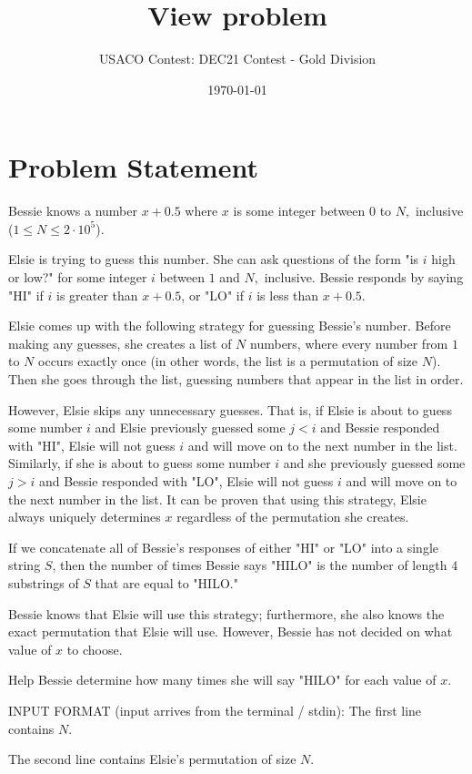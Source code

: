 \documentclass[12pt]{article}
\title{View problem}
\author{USACO Contest: DEC21 Contest - Gold Division}
\date{\today}
\begin{document}
\maketitle

\section*{Problem Statement}

Bessie knows a number $x+0.5$ where $x$ is some integer between $0$ to $N,$
inclusive ($1\le N\le 2 \cdot 10^5$).  

Elsie is trying to guess this number. She can ask questions of the form  "is $i$
high or low?" for some integer $i$ between $1$ and $N,$ inclusive.  Bessie
responds by saying "HI" if $i$ is greater than $x+0.5$, or "LO" if $i$ is less
than $x+0.5$.

Elsie comes up with the following strategy for guessing Bessie's number.  Before
making any guesses, she creates a list of $N$ numbers, where every number from
$1$ to $N$ occurs exactly once (in other words, the list is a permutation of
size $N$). Then she goes through the list, guessing numbers that appear in the
list in order.

However, Elsie skips any unnecessary guesses. That is, if Elsie is about to
guess some number $i$ and Elsie previously guessed some $j < i$ and Bessie
responded with "HI", Elsie will not guess $i$ and will move on to the next
number in the list. Similarly, if she is about to guess some number $i$ and she
previously guessed some $j > i$ and Bessie responded with "LO", Elsie will not
guess $i$ and will move on to the next number in the list. It can be proven that
using this strategy, Elsie always uniquely determines $x$ regardless of the
permutation she creates.

If we concatenate all of Bessie's responses of either "HI" or "LO" into a single
string $S$, then the number of times Bessie says "HILO" is the number of length
$4$ substrings of $S$ that are equal to "HILO."

Bessie knows that Elsie will use this strategy; furthermore, she also knows the
exact permutation that Elsie will use. However, Bessie has not decided on what
value of $x$ to choose.

Help Bessie determine how many times she will say "HILO" for each value of $x$.

INPUT FORMAT (input arrives from the terminal / stdin):
The first line contains $N.$ 

The second line contains Elsie's permutation of size $N.$
\end{document}
